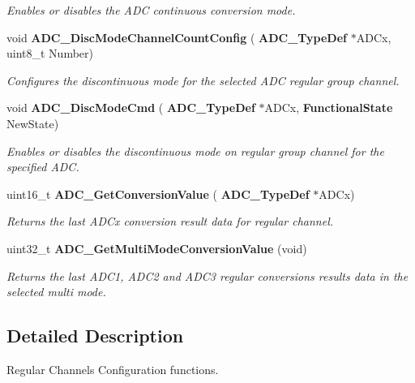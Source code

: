 \begin{DoxyCompactItemize}
\begin{DoxyCompactList}\small\item\em Enables or disables the A\+DC continuous conversion mode. \end{DoxyCompactList}\item 
void \textbf{ A\+D\+C\+\_\+\+Disc\+Mode\+Channel\+Count\+Config} (\textbf{ A\+D\+C\+\_\+\+Type\+Def} $\ast$A\+D\+Cx, uint8\+\_\+t Number)
\begin{DoxyCompactList}\small\item\em Configures the discontinuous mode for the selected A\+DC regular group channel. \end{DoxyCompactList}\item 
void \textbf{ A\+D\+C\+\_\+\+Disc\+Mode\+Cmd} (\textbf{ A\+D\+C\+\_\+\+Type\+Def} $\ast$A\+D\+Cx, \textbf{ Functional\+State} New\+State)
\begin{DoxyCompactList}\small\item\em Enables or disables the discontinuous mode on regular group channel for the specified A\+DC. \end{DoxyCompactList}\item 
uint16\+\_\+t \textbf{ A\+D\+C\+\_\+\+Get\+Conversion\+Value} (\textbf{ A\+D\+C\+\_\+\+Type\+Def} $\ast$A\+D\+Cx)
\begin{DoxyCompactList}\small\item\em Returns the last A\+D\+Cx conversion result data for regular channel. \end{DoxyCompactList}\item 
uint32\+\_\+t \textbf{ A\+D\+C\+\_\+\+Get\+Multi\+Mode\+Conversion\+Value} (void)
\begin{DoxyCompactList}\small\item\em Returns the last A\+D\+C1, A\+D\+C2 and A\+D\+C3 regular conversions results data in the selected multi mode. \end{DoxyCompactList}\end{DoxyCompactItemize}


\subsection{Detailed Description}
Regular Channels Configuration functions. 

